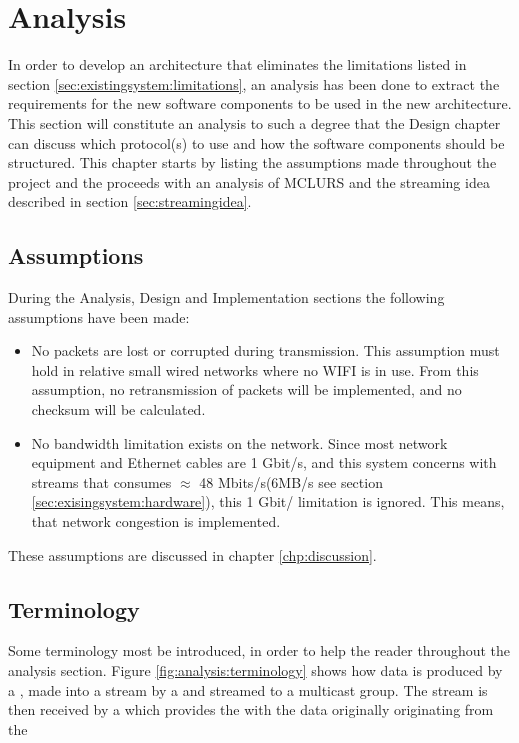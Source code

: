 \chapter{Analysis} \label{chp:analysis}
In order to develop an architecture that eliminates the limitations listed in section \ref{sec:existingsystem:limitations}, an analysis has been done to extract the requirements for the new software components to be used in the new architecture.
This section will constitute an analysis to such a degree that the Design chapter can discuss which protocol(s) to use and how the software components should be structured. This chapter starts by listing the assumptions made throughout the project and the proceeds with an analysis of MCLURS and the streaming idea described in section \ref{sec:streamingidea}.



\section{Assumptions}
During the Analysis, Design and Implementation sections the following assumptions have been made:
\begin{itemize}
	\item No packets are lost or corrupted during transmission. This assumption must hold in relative small wired networks where no WIFI is in use. From this assumption, no retransmission of packets will be implemented, and no checksum will be calculated.
	\item No bandwidth limitation exists on the network. Since most network equipment and Ethernet cables are 1 Gbit/s, and this system concerns with streams that consumes $\approx$ 48 Mbits/s(6MB/s see section \ref{sec:exisingsystem:hardware}), this 1 Gbit/ limitation is ignored. This means, that network congestion is implemented. 
\end{itemize}

These assumptions are discussed in chapter \ref{chp:discussion}. 

\section{Terminology} \label{sec:analysis:terminology}
Some terminology most be introduced, in order to help the reader throughout the analysis section. Figure \ref{fig:analysis:terminology} shows how data is produced by a , made into a stream by a  and streamed to a multicast group. The stream is then received by a  which provides the  with the data originally originating from the 

